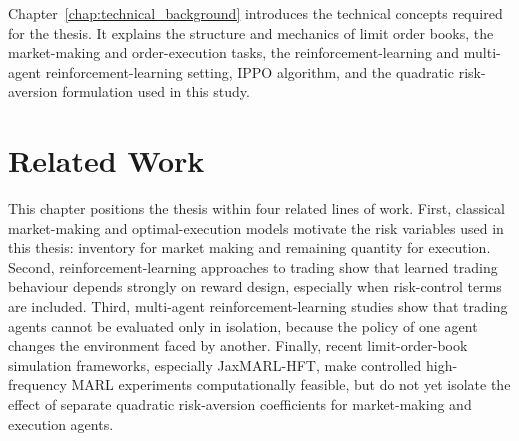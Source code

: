 \documentclass[oneside]{uva-inf-bachelor-thesis}
\begin{document}
Chapter~\ref{chap:technical_background} introduces the technical concepts required for the thesis. It explains the structure and mechanics of limit order books, the market-making and order-execution tasks, the reinforcement-learning and multi-agent reinforcement-learning setting, IPPO algorithm, and the quadratic risk-aversion formulation used in this study.







\chapter{Related Work}
\label{chap:related_work}

This chapter positions the thesis within four related lines of work. First, classical market-making and optimal-execution models motivate the risk variables used in this thesis: inventory for market making and remaining quantity for execution. Second, reinforcement-learning approaches to trading show that learned trading behaviour depends strongly on reward design, especially when risk-control terms are included. Third, multi-agent reinforcement-learning studies show that trading agents cannot be evaluated only in isolation, because the policy of one agent changes the environment faced by another. Finally, recent limit-order-book simulation frameworks, especially JaxMARL-HFT, make controlled high-frequency MARL experiments computationally feasible, but do not yet isolate the effect of separate quadratic risk-aversion coefficients for market-making and execution agents.
\end{document}
